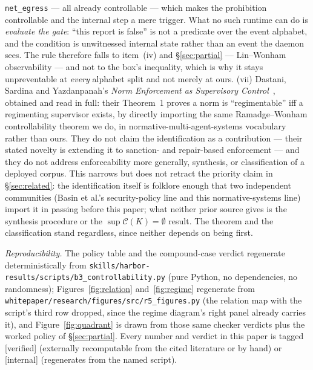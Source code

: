 \documentclass[11pt,a4paper]{article}  \usepackage{mdframed} \usepackage{graphicx}
\begin{document}
\begin{boundary}
\texttt{net\_egress} --- all already controllable --- which makes the prohibition controllable and the internal step a mere
trigger. What no such runtime can do is \emph{evaluate the gate}: ``this report is false'' is not a predicate over the event
alphabet, and the condition is unwitnessed internal state rather than an event the daemon sees. The rule therefore falls to
item~(iv) and \S\ref{sec:partial} --- Lin--Wonham observability --- and not to the box's inequality, which is why it stays
unpreventable at \emph{every} alphabet split and not merely at ours. (vii) Dastani, Sardina and Yazdanpanah's \emph{Norm
Enforcement as Supervisory Control}~\cite{dsy17}, obtained and read in full: their Theorem~1 proves a norm is
``regimentable'' iff a regimenting supervisor exists, by directly importing the same Ramadge--Wonham controllability
theorem we do, in normative-multi-agent-systems vocabulary rather than ours. They do not claim the identification as a
contribution --- their stated novelty is extending it to sanction- and repair-based enforcement --- and they do not
address enforceability more generally, synthesis, or classification of a deployed corpus. This narrows but does not
retract the priority claim in \S\ref{sec:related}: the identification itself is folklore enough that two independent
communities (Basin et al.'s security-policy line and this normative-systems line) import it in passing before this
paper; what neither prior source gives is the synthesis procedure or the $\sup\mathcal{C}(K)=\emptyset$ result. The
theorem and the classification stand regardless, since neither depends on being first. \end{boundary}

\vspace{0.4em} \noindent\emph{Reproducibility.} The policy table and the compound-case verdict regenerate deterministically
from \texttt{skills/harbor-results/scripts/b3\_controllability.py} (pure Python, no dependencies, no randomness);
Figures~\ref{fig:relation} and~\ref{fig:regime} regenerate from \texttt{whitepaper/research/figures/src/r5\_figures.py}
(the relation map with the script's third row dropped, since the regime diagram's right panel already carries it), and
Figure~\ref{fig:quadrant} is drawn from those same checker verdicts plus the worked policy of \S\ref{sec:partial}. Every number and verdict in this paper is
tagged [verified] (externally recomputable from the cited literature or by hand) or [internal] (regenerates from the named
script).
\end{document}
